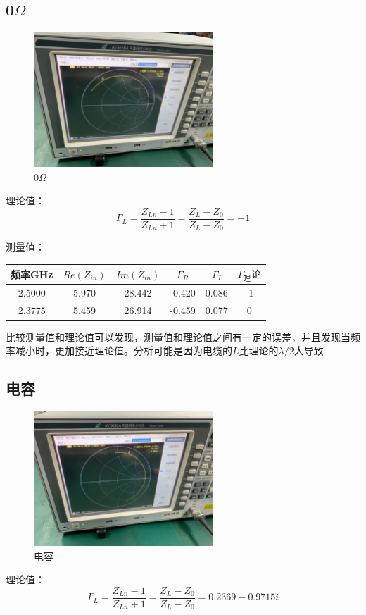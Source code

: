 \documentclass{../source/Experiment}
\begin{document}
        \subsection{0$\Omega$}
            \begin{figure}[H]
                \centering
                \includegraphics[width = 0.6\textwidth]{pic/02}
                \caption{0$\Omega$}
            \end{figure}
        理论值：$$\Gamma _L = \frac{Z_{Ln}-1}{Z_{Ln}+1} = \frac{Z_L - Z_0}{Z_L - Z_0} = -1$$
        
        测量值：
        \begin{table}[H]
            \centering
            \begin{tabular}{|c|c|c|c|c|c|}
            \hline
            频率GHz  & $Re(Z_{in})$ & $Im(Z_{in})$ & $\Gamma _R$ & $\Gamma _I$ & $\Gamma _理论$ \\ \hline
            2.5000 & 5.970      & 28.442     & -0.420      & 0.086       & -1           \\ \hline
            2.3775 & 5.459      & 26.914     & -0.459      & 0.077       & 0            \\ \hline
            \end{tabular}
        \end{table}
            
        比较测量值和理论值可以发现，测量值和理论值之间有一定的误差，并且发现当频率减小时，更加接近理论值。分析可能是因为电缆的$L$比理论的$\lambda /2$大导致

        \subsection{电容}
            \begin{figure}[H]
                \centering
                \includegraphics[width = 0.6\textwidth]{pic/L2}
                \caption{电容}
            \end{figure}
            理论值：$$\Gamma _L = \frac{Z_{Ln}-1}{Z_{Ln}+1} = \frac{Z_L - Z_0}{Z_L - Z_0} = 0.2369 −
            0.9715i$$
            
\end{document}
